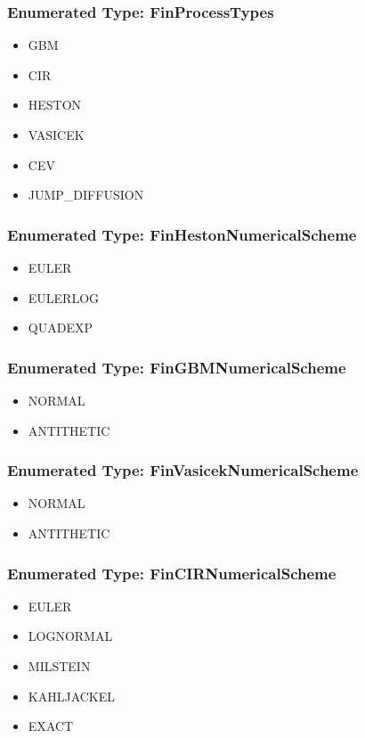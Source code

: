 \documentclass[twoside,11pt]{book}
\begin{document}
\subsubsection{Enumerated Type: FinProcessTypes}
\begin{itemize}
\item{GBM}
\item{CIR}
\item{HESTON}
\item{VASICEK}
\item{CEV}
\item{JUMP\_DIFFUSION}
\end{itemize}

\subsubsection{Enumerated Type: FinHestonNumericalScheme}
\begin{itemize}
\item{EULER}
\item{EULERLOG}
\item{QUADEXP}
\end{itemize}

\subsubsection{Enumerated Type: FinGBMNumericalScheme}
\begin{itemize}
\item{NORMAL}
\item{ANTITHETIC}
\end{itemize}

\subsubsection{Enumerated Type: FinVasicekNumericalScheme}
\begin{itemize}
\item{NORMAL}
\item{ANTITHETIC}
\end{itemize}

\subsubsection{Enumerated Type: FinCIRNumericalScheme}
\begin{itemize}
\item{EULER}
\item{LOGNORMAL}
\item{MILSTEIN}
\item{KAHLJACKEL}
\item{EXACT}
\end{itemize}
\end{document}

